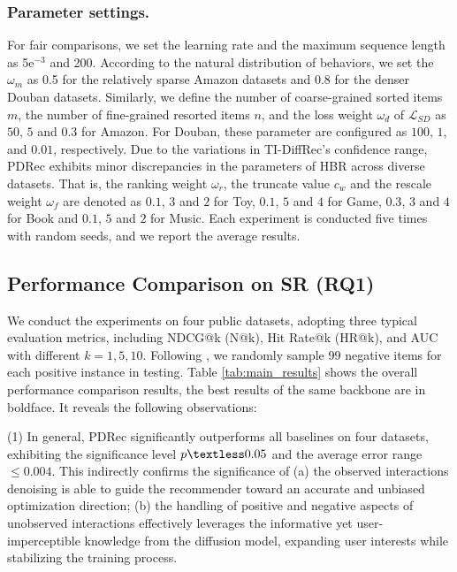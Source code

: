 \documentclass[letterpaper]{article} %
\begin{document}
\subsubsection{Parameter settings.}
For fair comparisons, we set the learning rate and the maximum sequence length as 5e$^{-3}$ and 200. According to the natural distribution of behaviors, we set the $\omega_m$ as 0.5 for the relatively sparse Amazon datasets and 0.8 for the denser Douban datasets. Similarly, we define the number of coarse-grained sorted items $m$, the number of fine-grained resorted items $n$, and the loss weight $\omega_d$ of $\mathcal{L}_{SD}$ as $50$, $5$ and $0.3$ for Amazon. For Douban, these parameter are configured as $100$, $1$, and $0.01$, respectively. Due to the variations in TI-DiffRec's confidence range, PDRec exhibits minor discrepancies in the parameters of HBR across diverse datasets. That is, the ranking weight $\omega_r$, the truncate value $c_w$ and the rescale weight $\omega_f$ are denoted as $0.1$, $3$ and $2$ for Toy, $0.1$, $5$ and $4$ for Game, $0.3$, $3$ and $4$ for Book and $0.1$, $5$ and $2$ for Music. Each experiment is conducted five times with random seeds, and we report the average results.

\subsection{Performance Comparison on SR (RQ1)}
\label{sec.performance}
We conduct the experiments on four public datasets, adopting three typical evaluation metrics, including NDCG@k (N@k), Hit Rate@k (HR@k), and AUC with different $k=1,5,10$. Following \cite{SASRec}, we randomly sample 99 negative items for each positive instance in testing. Table \ref{tab:main_results} shows the overall performance comparison results, the best results of the same backbone are in boldface. It reveals the following observations:

(1) In general, PDRec significantly outperforms all baselines on four datasets, exhibiting the significance level $p \textless 0.05$ and the average error range $\leq 0.004$. This indirectly confirms the significance of (a) the observed interactions denoising is able to guide the recommender toward an accurate and unbiased optimization direction; (b) the handling of positive and negative aspects of unobserved interactions effectively leverages the informative yet user-imperceptible knowledge from the diffusion model, expanding user interests while stabilizing the training process. 
\end{document}
